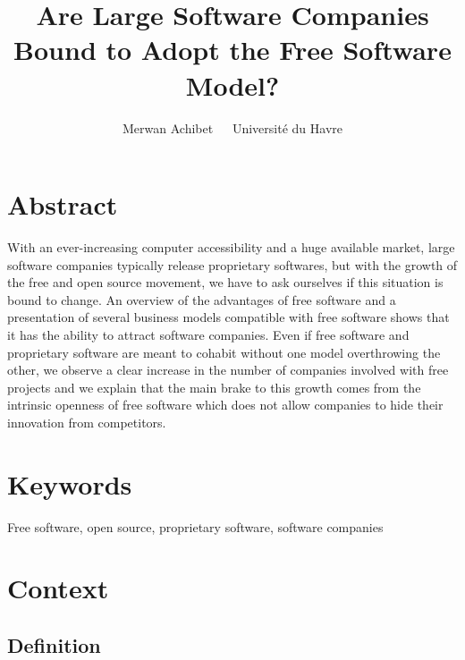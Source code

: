 \documentclass[12pt]{article}
\title{Are Large Software Companies Bound to Adopt the Free Software Model?}
\author{Merwan Achibet $\;$ \textendash $\;$  Université du Havre}
\date{}
\begin{document}
\maketitle

\section*{Abstract}

With an ever-increasing computer accessibility and a huge available
market, large software companies typically release proprietary
softwares, but with the growth of the free and open source movement,
we have to ask ourselves if this situation is bound to change. An
overview of the advantages of free software and a presentation of
several business models compatible with free software shows that it
has the ability to attract software companies. Even if free software
and proprietary software are meant to cohabit without one model
overthrowing the other, we observe a clear increase in the number of
companies involved with free projects and we explain that the main
brake to this growth comes from the intrinsic openness of free
software which does not allow companies to hide their innovation from
competitors.

\section*{Keywords}

Free software, open source, proprietary software, software companies

\newpage

\tableofcontents

\newpage

\section{Context}

\subsection{Definition}
\end{document}
